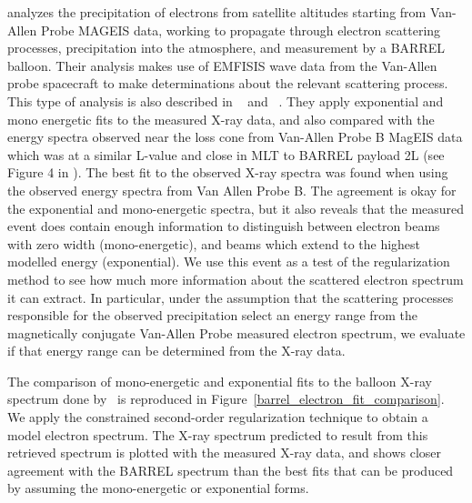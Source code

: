 \cite{Halford2015} analyzes the precipitation of electrons from satellite altitudes starting from Van-Allen Probe MAGEIS data, working to propagate through electron scattering processes, precipitation into the atmosphere, and measurement by a BARREL balloon. Their analysis makes use of EMFISIS wave data from the Van-Allen probe spacecraft to make determinations about the relevant scattering process. This type of analysis is also described in ~\cite{Millan2014} and ~\cite{Woodger2015}. They apply exponential and mono energetic fits to the measured X-ray data, and also compared with the energy spectra observed near the loss cone from Van-Allen Probe B MagEIS data which was at a similar L-value and close in MLT to BARREL payload 2L (see Figure 4 in \cite{Halford2015}). The best fit to the observed X-ray spectra was found when using the observed energy spectra from Van Allen Probe B. The agreement is okay for the exponential and mono-energetic spectra, but it also reveals that the measured event does contain enough information to distinguish between electron beams with zero width (mono-energetic), and beams which extend to the highest modelled energy (exponential). We use this event as a test of the regularization method to see how much more information about the scattered electron spectrum it can extract. In particular, under the assumption that the scattering processes responsible for the observed precipitation select an energy range from the magnetically conjugate Van-Allen Probe measured electron spectrum, we evaluate if that energy range can be determined from the X-ray data. 

The comparison of mono-energetic and exponential fits to the balloon X-ray spectrum done by~\cite{Halford2015} is reproduced in Figure~\ref{barrel_electron_fit_comparison}. We apply the constrained second-order regularization technique to obtain a model electron spectrum. The X-ray spectrum predicted to result from this retrieved spectrum is plotted with the measured X-ray data, and shows closer agreement with the BARREL spectrum than the best fits that can be produced by assuming the mono-energetic or exponential forms. 

